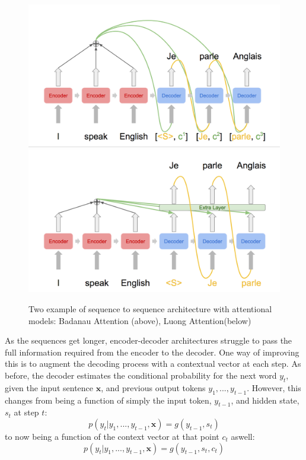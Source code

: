 \begin{figure}[tb]{}
    \centering

    \includegraphics[width=.7\linewidth]{ModelPics/bahd_diag.png}
    \includegraphics[width=.7\linewidth]{ModelPics/luong_diag2.png}
    \caption{Two example of sequence to sequence architecture with attentional models: Badanau Attention (above), Luong Attention(below)}
    \label{fig:attention} 

\end{figure}


As the sequences get longer, encoder-decoder architectures struggle to pass the full information required from the encoder to the decoder. 
One way of improving this is to augment the decoding process with a contextual vector at each step.  
As before, the decoder estimates the conditional probability for the next word $y_t$, given the input sentence $\mathbf{x}$, and previous output tokens ${y_1, ..., y_{t-1}}$.
 However, this changes from being a function of simply the input token, $y_{t-1}$, and hidden state, $s_{t}$ at step $t$:
\begin{equation}
p(y_t| y_1, ..., y_{t-1}, \mathbf{x} ) = g(y_{t-1}, s_t)
\end{equation}
to now being a function of the context vector at that point $c_t$ aswell:
\begin{equation}
p(y_t| y_1, ..., y_{t-1}, \mathbf{x} ) = g(y_{t-1}, s_t, c_t)
\end{equation}

